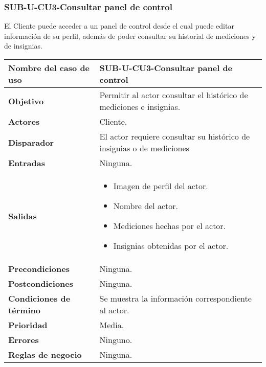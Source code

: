 \subsubsection{SUB-U-CU3-Consultar panel de control}\label{SUB-U-CU3}
El Cliente puede acceder a un panel de control desde el cual puede editar información de su perfil, además de poder consultar su historial de mediciones y de insignias.
\begin{longtable}{|J{5cm}|J{10.3cm}|}
	\hline
	\textbf{Nombre del caso de uso} &
		SUB-U-CU3-Consultar panel de control \\ \hline
	\textbf{Objetivo} &
		Permitir al actor consultar el histórico de mediciones e insignias. \\ \hline
	\textbf{Actores} &
		Cliente. \\ \hline 
	\textbf{Disparador} & 
		El actor requiere consultar su histórico de insignias o de mediciones\\ \hline 
	\textbf{Entradas} & Ninguna.
		\\ \hline 
	\textbf{Salidas} & 
		\begin{itemize}
			\item Imagen de perfil del actor.
			\item Nombre del actor.
			\item Mediciones hechas por el actor.
			\item Insignias obtenidas por el actor.
		\end{itemize} \\ \hline
	\textbf{Precondiciones} &
		Ninguna.\\ \hline
	\textbf{Postcondiciones} & Ninguna.
		\\ \hline
	\textbf{Condiciones de término} & Se muestra la información correspondiente al actor.
		\\ \hline 
	\textbf{Prioridad} & 
		Media. \\ \hline
	\textbf{Errores} & Ninguno.
		\\ \hline
	\textbf{Reglas de negocio} & Ninguna.
		 \\ \hline
\end{longtable}

